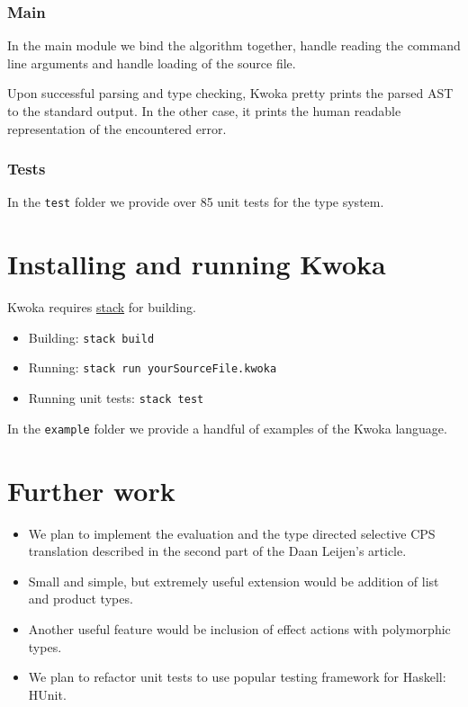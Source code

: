 \documentclass[a4paper]{article}
\begin{document}
\subsubsection*{Main}

In the main module we bind the algorithm together, handle reading the command line arguments and
handle loading of the source file.

Upon successful parsing and type checking, Kwoka pretty prints the parsed AST to the standard output.
In the other case, it prints the human readable representation of the encountered error.

\subsubsection*{Tests}
In the \verb+test+ folder we provide over 85 unit tests for the type system.

\section{Installing and running Kwoka}
Kwoka requires {\href{https://docs.haskellstack.org/en/stable/README/}{\color{blue}stack}} for building.
\begin{itemize}
    \item Building: \verb+stack build+
    \item Running: \verb+stack run yourSourceFile.kwoka+
    \item Running unit tests: \verb+stack test+
\end{itemize}
In the \verb+example+ folder we provide a handful of examples of the Kwoka language.

\section{Further work}
\begin{itemize}
  \item We plan to implement the evaluation and the type directed selective CPS translation described in the
  second part of the Daan Leijen's article\cite{leijen2017type}.
  \item Small and simple, but extremely useful extension would be addition of list and product
  types.
  \item Another useful feature would be inclusion of effect actions with polymorphic types.
  \item We plan to refactor unit tests to use popular testing framework for Haskell: HUnit.
\end{itemize}




\end{document}
